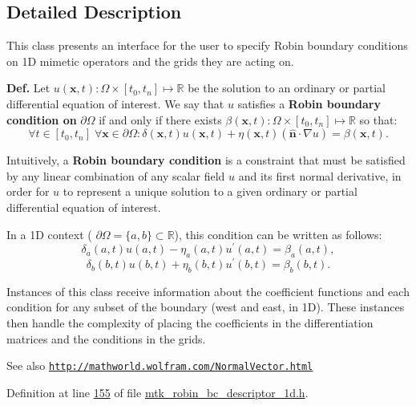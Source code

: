 \subsection{Detailed Description}
This class presents an interface for the user to specify Robin boundary conditions on 1\+D mimetic operators and the grids they are acting on.

{\bfseries Def.} Let $ u(\mathbf{x},t):\Omega\times [t_0, t_n]\mapsto\mathbb{R} $ be the solution to an ordinary or partial differential equation of interest. We say that $ u $ satisfies a {\bfseries Robin boundary condition on} $ \partial\Omega $ if and only if there exists $ \beta(\mathbf{x},t):\Omega\times [t_0, t_n]\mapsto\mathbb{R} $ so that\+: \[ \forall t \in [t_0,t_n]\; \forall \mathbf{x} \in \partial\Omega: \delta(\mathbf{x},t)u(\mathbf{x},t) + \eta(\mathbf{x},t)(\hat{\mathbf{n}}\cdot\nabla u) = \beta(\mathbf{x},t). \]

Intuitively, a {\bfseries Robin boundary condition} is a constraint that must be satisfied by any linear combination of any scalar field $ u $ and its first normal derivative, in order for $ u $ to represent a unique solution to a given ordinary or partial differential equation of interest.

In a 1\+D context ( $ \partial\Omega = \{a,b\}\subset\mathbb{R} $), this condition can be written as follows\+: \[ \delta_a(a,t)u(a,t) - \eta_a(a,t)u^\prime(a,t) = \beta_a(a,t), \] \[ \delta_b(b,t)u(b,t) + \eta_b(b,t)u^\prime(b,t) = \beta_b(b,t). \]

Instances of this class receive information about the coefficient functions and each condition for any subset of the boundary (west and east, in 1\+D). These instances then handle the complexity of placing the coefficients in the differentiation matrices and the conditions in the grids.

\begin{DoxySeeAlso}{See also}
\href{http://mathworld.wolfram.com/NormalVector.html}{\tt http\+://mathworld.\+wolfram.\+com/\+Normal\+Vector.\+html} 
\end{DoxySeeAlso}


Definition at line \hyperlink{mtk__robin__bc__descriptor__1d_8h_source_l00155}{155} of file \hyperlink{mtk__robin__bc__descriptor__1d_8h_source}{mtk\+\_\+robin\+\_\+bc\+\_\+descriptor\+\_\+1d.\+h}.



